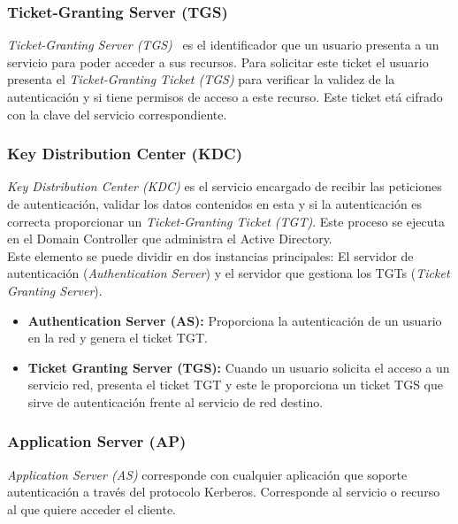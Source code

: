 \subsubsection{Ticket-Granting Server (TGS)}

{\it Ticket-Granting Server (TGS)}~\cite{Capitulo3:TGT} es el identificador que un usuario presenta a un servicio para poder acceder a sus recursos. Para solicitar este ticket el usuario presenta el {\it Ticket-Granting Ticket (TGS)} para verificar la validez de la autenticación y si tiene permisos de acceso a este recurso. Este ticket etá cifrado con la clave del servicio correspondiente.

\subsubsection{Key Distribution Center (KDC)} 

{\it Key Distribution Center (KDC)} es el servicio encargado de recibir las peticiones de autenticación, validar los datos contenidos en esta y si la autenticación es correcta proporcionar un {\it Ticket-Granting Ticket (TGT)}. Este proceso se ejecuta en el Domain Controller que administra el Active Directory. \\

Este elemento se puede dividir en dos instancias principales: El servidor de autenticación ({\it Authentication Server}) y el servidor que gestiona los TGTs ({\it Ticket Granting Server}). 

\begin{itemize}
\item \textbf{Authentication Server (AS):} Proporciona la autenticación de un usuario en la red y genera el ticket TGT. 
\item \textbf{Ticket Granting Server (TGS):} Cuando un usuario solicita el acceso a un servicio red, presenta el ticket TGT y este le proporciona un ticket TGS que sirve de autenticación frente al servicio de red destino. 
\end{itemize}

\subsubsection{Application Server (AP)}

{\it Application Server (AS)} corresponde con cualquier aplicación que soporte autenticación a través del protocolo Kerberos. Corresponde al servicio o recurso al que quiere acceder el cliente. 

